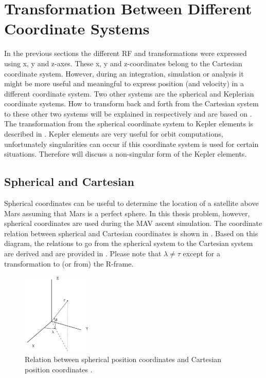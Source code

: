 \section{Transformation Between Different Coordinate Systems}
\label{sec:transsys}
In the previous sections the different \ac{RF} and transformations were expressed using x, y and z-axes. These x, y and z-coordinates belong to the Cartesian coordinate system. However, during an integration, simulation or analysis it might be more useful and meaningful to express position (and velocity) in a different coordinate system. Two other systems are the spherical and Keplerian coordinate systems. How to transform back and forth from the Cartesian system to these other two systems will be explained in  respectively and are based on \cite{noomen2013basic}. The transformation from the spherical coordinate system to Kepler elements is described in . Kepler elements are very useful for orbit computations, unfortunately singularities can occur if this coordinate system is used for certain situations. Therefore  will discuss a non-singular form of the Kepler elements. 

\subsection{Spherical and Cartesian}
\label{subsec:sphercart}
Spherical coordinates can be useful to determine the location of a satellite above Mars assuming that Mars is a perfect sphere. In this thesis problem, however, spherical coordinates are used during the \ac{MAV} ascent simulation. The coordinate relation between spherical and Cartesian coordinates is shown in . Based on this diagram, the relations to go from the spherical system to the Cartesian system are derived and are provided in . Please note that $\lambda\neq\tau$ except for a transformation to (or from) the R-frame.

\begin{figure}[!ht]
\centering
\includegraphics[width=0.3\textwidth]{figures/reference_frames/sphertocart_noomen2013basic.jpg}
\caption{Relation between spherical position coordinates and Cartesian position coordinates \citep{noomen2013basic}.}
\label{fig:sphertocart_noomen2013basic}
\end{figure}

